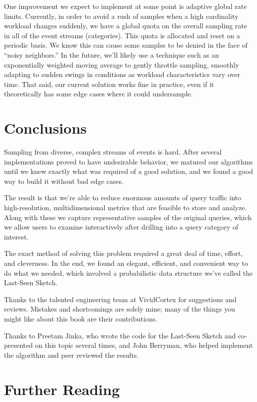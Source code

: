 \documentclass{vivid_layout}
\begin{document}
One improvement we expect to implement at some point is adaptive global rate
limits. Currently, in order to avoid a rush of samples when a high cardinality
workload changes suddenly, we have a global quota on the overall sampling rate
in all of the event streams (categories). This quota is allocated and reset on a
periodic basis. We know this can cause some samples to be denied in the face of
``noisy neighbors.'' In the future, we'll likely use a technique such as an
exponentially weighted moving average to gently throttle sampling, smoothly
adapting to sudden swings in conditions as workload characteristics vary over
time. That said, our current solution works fine in practice, even if it
theoretically has some edge cases where it could undersample.

\section{Conclusions}

Sampling from diverse, complex streams of events is hard. After several
implementations proved to have undesirable behavior, we matured our algorithms 
until we knew exactly what was required of a good solution, and we found a good
way to build it without bad edge cases.

The result is that we're able to reduce enormous amounts of query traffic into
high-resolution, multidimensional metrics that are feasible to store and
analyze. Along with these we capture representative samples of the original
queries, which we allow users to examine interactively after drilling into a
query category of interest.

The exact method of solving this problem required a great deal of time, effort,
and cleverness. In the end, we found an elegant, efficient, and convenient way
to do what we needed, which involved a probabilistic data structure we've called
the Last-Seen Sketch.

Thanks to the talented engineering team at VividCortex for suggestions and
reviews. Mistakes and shortcomings are solely mine; many of the things you might
like about this book are their contributions.

Thanks to Preetam Jinka, who wrote the code for the Last-Seen Sketch and
co-presented on this topic several times, and John Berryman, who helped
implement the algorithm and peer reviewed the results.

\section{Further Reading}
\end{document}
